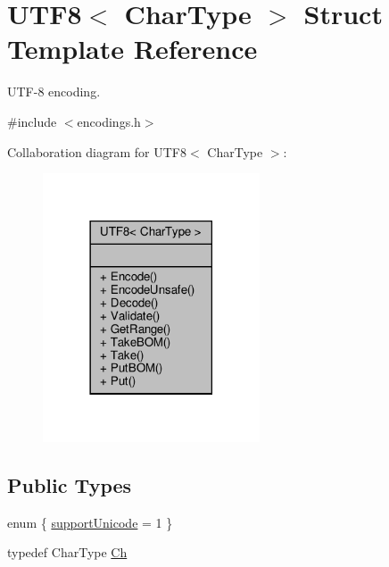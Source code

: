 \hypertarget{structUTF8}{}\section{U\+T\+F8$<$ Char\+Type $>$ Struct Template Reference}
\label{structUTF8}


U\+T\+F-\/8 encoding.  




{\ttfamily \#include $<$encodings.\+h$>$}



Collaboration diagram for U\+T\+F8$<$ Char\+Type $>$\+:
\nopagebreak
\begin{figure}[H]
\begin{center}
\leavevmode
\includegraphics[width=182pt]{structUTF8__coll__graph}
\end{center}
\end{figure}
\subsection*{Public Types}
\begin{DoxyCompactItemize}
\item 
enum \{ \hyperlink{structUTF8_a414ff601aaf1d01a186a73493dca09a3a1a78b02dbcc9ddfd12f86a51cddf8fad}{support\+Unicode} = 1
 \}
\item 
typedef Char\+Type \hyperlink{structUTF8_a8e78c8113f3660178d8121b7d3e55890}{Ch}
\end{DoxyCompactItemize}
